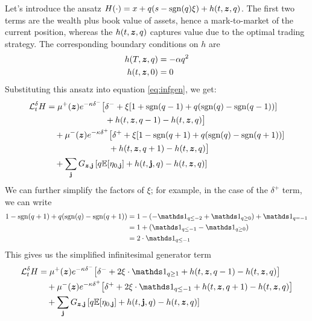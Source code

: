 Let's introduce the ansatz $H(\cdot) = x + q(s - \mathrm{sgn}(q)\xi) + h(t,\bm{z},q)$. The first two terms are the wealth plus book value of assets, hence a mark-to-market of the current position, whereas the $h(t,\bm{z},q)$ captures value due to the optimal trading strategy. The corresponding boundary conditions on $h$ are
\begin{align}
h(T, \bm{z}, q) & = - \alpha q^2 \\
h(t, \bm{z}, 0) & = 0
\end{align}
Substituting this ansatz into equation \ref{eq:infgen}, we get:
\begin{equation}
\begin{split}
\cL^{\delta}_t H & = \mu^+(\bz) e^{ -\kappa \delta^{-}} \bigl[ \delta^- + \xi [ 1 + \mathrm{sgn}(q-1) + q(\mathrm{sgn}(q) - \mathrm{sgn}(q-1) ) ] \\
& \hphantom{ {}={} \mu^+(\bz) e^{ -\kappa \delta^{-}} \bigl[ } + h(t,\bz,q-1) - h(t,\bz,q) \bigr] \\
& \quad + \mu^-(\bz) e^{ -\kappa \delta^{+}} \bigl[ \delta^+ + \xi [ 1 - \mathrm{sgn}(q+1) + q(\mathrm{sgn}(q) - \mathrm{sgn}(q+1) ) ] \\
& \hphantom{\quad + \mu^-(\bz) e^{ -\kappa \delta^{+}} \bigl[} + h(t,\bz,q+1) - h(t,\bz,q) \bigr] \\
& \quad + \sum_{\bj} G_{\bz,\bj} \left[q \E [\eta_{0,\bj}] +h(t,\bj,q) - h(t,\bz, q) \right]
\end{split}
\end{equation}
We can further simplify the factors of $\xi$; for example, in the case of the $\delta^+$ term, we can write
\begin{align*}
1 - \mathrm{sgn}(q+1) + q(\mathrm{sgn}(q) - \mathrm{sgn}(q+1) )  & = 
1 - (- \indicator_{q \leq -2} + \indicator_{q \geq 0}) +  \indicator_{q = -1} \\
& = 1 + ( \indicator_{q \leq -1} -  \indicator_{q \geq 0} )\\
& = 2 \cdot \indicator_{q \leq -1}
\end{align*}
This gives us the simplified infinitesimal generator term
\begin{equation}
\begin{split}
\cL^{\delta}_t H & = \mu^+(\bz) e^{ -\kappa \delta^{-}} \bigl[ \delta^- + 2 \xi \cdot \indicator_{q \geq 1} + h(t,\bz,q-1) - h(t,\bz,q) \bigr] \\
& \quad + \mu^-(\bz) e^{ -\kappa \delta^{+}} \bigl[ \delta^+ + 2 \xi \cdot \indicator_{q \leq -1} + h(t,\bz,q+1) - h(t,\bz,q) \bigr] \\
& \quad + \sum_{\bj} G_{\bz,\bj} \left[q \E [\eta_{0,\bj}] +h(t,\bj,q) - h(t,\bz, q) \right]
\end{split}
\end{equation}
